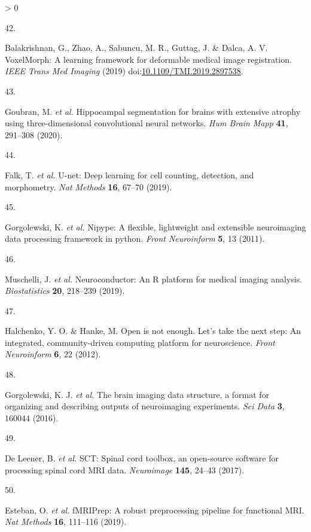 \documentclass[
  12pt,
]{article}
\newlength{\cslhangindent}
\newlength{\csllabelwidth}
\newenvironment{CSLReferences}[3] %
 {%
  \setlength{\parindent}{0pt}
  \ifodd #1 \everypar{\setlength{\hangindent}{\cslhangindent}}\ignorespaces\fi
  \ifnum #2 > 0
  \setlength{\parskip}{#3\baselineskip}
  \fi
 }%
 {}
\newcommand{\CSLLeftMargin}[1]{\parbox[t]{\maxof{\widthof{#1}}{\csllabelwidth}}{#1}}
\newcommand{\CSLRightInline}[1]{\parbox[t]{\linewidth}{#1}}
\begin{document}
\begin{CSLReferences}{0}{0}
\leavevmode\hypertarget{ref-Balakrishnan:2019aa}{}%
\CSLLeftMargin{42. }
\CSLRightInline{Balakrishnan, G., Zhao, A., Sabuncu, M. R., Guttag, J.
\& Dalca, A. V. VoxelMorph: A learning framework for deformable medical
image registration. \emph{IEEE Trans Med Imaging} (2019)
doi:\href{https://doi.org/10.1109/TMI.2019.2897538}{10.1109/TMI.2019.2897538}.}

\leavevmode\hypertarget{ref-Goubran:2020aa}{}%
\CSLLeftMargin{43. }
\CSLRightInline{Goubran, M. \emph{et al.} Hippocampal segmentation for
brains with extensive atrophy using three-dimensional convolutional
neural networks. \emph{Hum Brain Mapp} \textbf{41}, 291--308 (2020).}

\leavevmode\hypertarget{ref-Falk:2019aa}{}%
\CSLLeftMargin{44. }
\CSLRightInline{Falk, T. \emph{et al.} U-net: Deep learning for cell
counting, detection, and morphometry. \emph{Nat Methods} \textbf{16},
67--70 (2019).}

\leavevmode\hypertarget{ref-Gorgolewski:2011aa}{}%
\CSLLeftMargin{45. }
\CSLRightInline{Gorgolewski, K. \emph{et al.} Nipype: A flexible,
lightweight and extensible neuroimaging data processing framework in
python. \emph{Front Neuroinform} \textbf{5}, 13 (2011).}

\leavevmode\hypertarget{ref-Muschelli:2019aa}{}%
\CSLLeftMargin{46. }
\CSLRightInline{Muschelli, J. \emph{et al.} Neuroconductor: An {R}
platform for medical imaging analysis. \emph{Biostatistics} \textbf{20},
218--239 (2019).}

\leavevmode\hypertarget{ref-Halchenko:2012aa}{}%
\CSLLeftMargin{47. }
\CSLRightInline{Halchenko, Y. O. \& Hanke, M. Open is not enough. Let's
take the next step: An integrated, community-driven computing platform
for neuroscience. \emph{Front Neuroinform} \textbf{6}, 22 (2012).}

\leavevmode\hypertarget{ref-Gorgolewski:2016aa}{}%
\CSLLeftMargin{48. }
\CSLRightInline{Gorgolewski, K. J. \emph{et al.} The brain imaging data
structure, a format for organizing and describing outputs of
neuroimaging experiments. \emph{Sci Data} \textbf{3}, 160044 (2016).}

\leavevmode\hypertarget{ref-De-Leener:2017aa}{}%
\CSLLeftMargin{49. }
\CSLRightInline{De Leener, B. \emph{et al.} SCT: Spinal cord toolbox, an
open-source software for processing spinal cord {MRI} data.
\emph{Neuroimage} \textbf{145}, 24--43 (2017).}

\leavevmode\hypertarget{ref-Esteban:2019aa}{}%
\CSLLeftMargin{50. }
\CSLRightInline{Esteban, O. \emph{et al.} fMRIPrep: A robust
preprocessing pipeline for functional {MRI}. \emph{Nat Methods}
\textbf{16}, 111--116 (2019).}


\end{CSLReferences}
\end{document}
